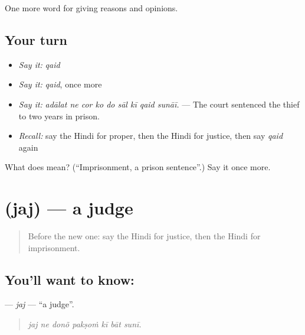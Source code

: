 \begin{grammarlens}[title={What you've built}]
One more word for giving reasons and opinions.
\end{grammarlens}

\subsection*{Your turn}
\begin{itemize}
\raggedright
  \item \emph{Say it:} \emph{qaid}
  \item \emph{Say it:} \emph{qaid}, once more
  \item \emph{Say it:} \emph{adālat ne cor ko do sāl kī qaid sunāī.} — The court sentenced the thief to two years in prison.
  \item \emph{Recall:} say the Hindi for proper, then the Hindi for justice, then say \emph{qaid} again
\end{itemize}

\begin{tcolorbox}[breakable,colback=teal!4,colframe=teal!35!black,title={Before you move on}]
What does  mean? (\textquotedblleft{}Imprisonment, a prison sentence\textquotedblright{}.) Say it once more.
\end{tcolorbox}
\section[\texorpdfstring{\hi{जज} (jaj)}{जज (jaj)}]{ (jaj) — a judge}

\label{lesson:HI-C352-jaj}



\begin{quote}
Before the new one: say the Hindi for justice, then the Hindi for imprisonment.
\end{quote}

\subsection*{You'll want to know: }
\textbf{} — \emph{jaj} — \textquotedblleft{}a judge\textquotedblright{}.

\begin{quote}
      
\end{quote}

\begin{quote}
\emph{jaj ne donõ pakṣoṁ kī bāt sunī.}
\end{quote}

